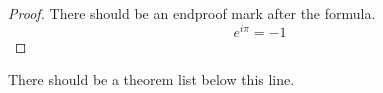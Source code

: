 \documentclass{article}
\begin{document}
\begin{proof}
  There should be an endproof mark after the formula.
  \begin{displaymath}
    e^{i\pi}=-1
  \end{displaymath}
\end{proof}
There should be a theorem list below this line.
\end{document}
